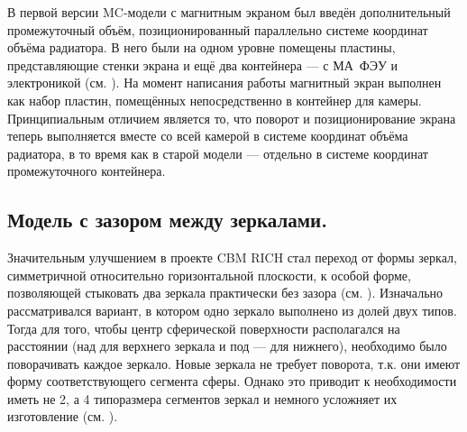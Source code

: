 В первой версии MC-модели с магнитным экраном был введён дополнительный промежуточный объём, позиционированный параллельно системе координат объёма радиатора. В него были на одном уровне помещены пластины, представляющие стенки экрана и ещё два контейнера --- с МА~ФЭУ и электроникой (см. ). На момент написания работы магнитный экран выполнен как набор пластин, помещённых непосредственно в контейнер для камеры. Принципиальным отличием является то, что поворот и позиционирование экрана теперь выполняется вместе со всей камерой в системе координат объёма радиатора, в то время как в старой модели --- отдельно в системе координат промежуточного контейнера.

\subsection{Модель с зазором между зеркалами.}\label{sec:secMirrorsEvolution}

Значительным улучшением в проекте CBM RICH стал переход от формы зеркал, симметричной относительно горизонтальной плоскости, к особой форме, позволяющей стыковать два зеркала практически без зазора (см. ). Изначально рассматривался вариант, в котором одно зеркало выполнено из долей двух типов. Тогда для того, чтобы центр сферической поверхности располагался на расстоянии (над для верхнего зеркала и под --- для нижнего), необходимо было поворачивать каждое зеркало. Новые зеркала не требует поворота, т.к. они имеют форму соответствующего сегмента сферы. Однако это приводит к необходимости иметь не 2, а 4 типоразмера сегментов зеркал и немного усложняет их изготовление (см. ).


